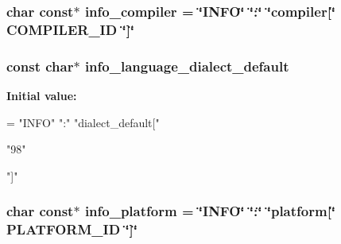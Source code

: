 \subsubsection[{\texorpdfstring{info\+\_\+compiler}{info_compiler}}]{\setlength{\rightskip}{0pt plus 5cm}char const$\ast$ info\+\_\+compiler = \char`\"{}I\+N\+FO\char`\"{} \char`\"{}\+:\char`\"{} \char`\"{}compiler\mbox{[}\char`\"{} C\+O\+M\+P\+I\+L\+E\+R\+\_\+\+ID \char`\"{}\mbox{]}\char`\"{}}\hypertarget{a00015_a4b0efeb7a5d59313986b3a0390f050f6_a4b0efeb7a5d59313986b3a0390f050f6}{}\label{a00015_a4b0efeb7a5d59313986b3a0390f050f6_a4b0efeb7a5d59313986b3a0390f050f6}
\subsubsection[{\texorpdfstring{info\+\_\+language\+\_\+dialect\+\_\+default}{info_language_dialect_default}}]{\setlength{\rightskip}{0pt plus 5cm}const char$\ast$ info\+\_\+language\+\_\+dialect\+\_\+default}\hypertarget{a00015_a1ce162bad2fe6966ac8b33cc19e120b8_a1ce162bad2fe6966ac8b33cc19e120b8}{}\label{a00015_a1ce162bad2fe6966ac8b33cc19e120b8_a1ce162bad2fe6966ac8b33cc19e120b8}
{\bfseries Initial value\+:}
\begin{DoxyCode}
= \textcolor{stringliteral}{"INFO"} \textcolor{stringliteral}{":"} \textcolor{stringliteral}{"dialect\_default["}







  \textcolor{stringliteral}{"98"}

\textcolor{stringliteral}{"]"}
\end{DoxyCode}
\subsubsection[{\texorpdfstring{info\+\_\+platform}{info_platform}}]{\setlength{\rightskip}{0pt plus 5cm}char const$\ast$ info\+\_\+platform = \char`\"{}I\+N\+FO\char`\"{} \char`\"{}\+:\char`\"{} \char`\"{}platform\mbox{[}\char`\"{} P\+L\+A\+T\+F\+O\+R\+M\+\_\+\+ID \char`\"{}\mbox{]}\char`\"{}}\hypertarget{a00015_a2321403dee54ee23f0c2fa849c60f7d4_a2321403dee54ee23f0c2fa849c60f7d4}{}\label{a00015_a2321403dee54ee23f0c2fa849c60f7d4_a2321403dee54ee23f0c2fa849c60f7d4}

